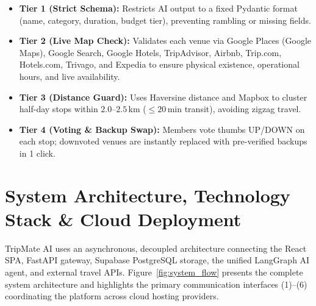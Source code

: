 \documentclass[11pt,a4paper]{article}
\begin{document}
\begin{itemize}[leftmargin=1.2em]
\item \textbf{Tier 1 (Strict Schema):} Restricts AI output to a fixed Pydantic format (name, category, duration, budget tier), preventing rambling or missing fields.
\item \textbf{Tier 2 (Live Map Check):} Validates each venue via Google Places (Google Maps), Google Search, Google Hotels, TripAdvisor, Airbnb, Trip.com, Hotels.com, Trivago, and Expedia to ensure physical existence, operational hours, and live availability.
\item \textbf{Tier 3 (Distance Guard):} Uses Haversine distance and Mapbox to cluster half-day stops within $2.0$--$2.5$\,km ($\le 20$\,min transit), avoiding zigzag travel.
\item \textbf{Tier 4 (Voting \& Backup Swap):} Members vote thumbs UP/DOWN on each stop; downvoted venues are instantly replaced with pre-verified backups in 1 click.
\end{itemize}

\section{System Architecture, Technology Stack \& Cloud Deployment}

TripMate AI uses an asynchronous, decoupled architecture connecting the React SPA, FastAPI gateway, Supabase PostgreSQL storage, the unified LangGraph AI agent, and external travel APIs. Figure~\ref{fig:system_flow} presents the complete system architecture and highlights the primary communication interfaces (1)--(6) coordinating the platform across cloud hosting providers.
\end{document}
